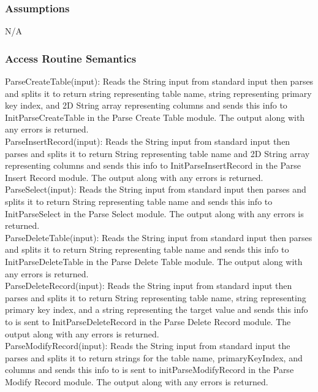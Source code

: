 \documentclass[12pt]{article}
\begin{document}
\subsubsection {Assumptions}
N/A


\subsubsection {Access Routine Semantics}

\noindent ParseCreateTable(input): Reads the String input from standard input then parses and splits it to return string representing table name, string representing primary key index, and 2D String array representing columns and sends this info to InitParseCreateTable in the Parse Create Table module. The output along with any errors is returned. \\

\noindent ParseInsertRecord(input): Reads the String input from standard input then parses and splits it to return String representing table name and 2D String array representing columns and sends this info to InitParseInsertRecord in the Parse Insert Record module. The output along with any errors is returned.\\

\noindent ParseSelect(input): Reads the String input from standard input then parses and splits it to return String representing table name and sends this info to InitParseSelect in the Parse Select module. The output along with any errors is returned.\\

\noindent ParseDeleteTable(input): Reads the String input from standard input then parses and splits it to return String representing table name and sends this info to InitParseDeleteTable in the Parse Delete Table module. The output along with any errors is returned.\\

\noindent ParseDeleteRecord(input): Reads the String input from standard input then parses and splits it to return String representing table name, string representing primary key index, and a string representing the target value and sends this info to is sent to InitParseDeleteRecord in the Parse Delete Record module. The output along with any errors is returned.\\ 

\noindent ParseModifyRecord(input): Reads the String input from standard input the parses and splits it to return strings for the table name, primaryKeyIndex, and columns and sends this info to is sent to initParseModifyRecord in the Parse Modify Record module. The output along with any errors is returned.\\
\end{document}

